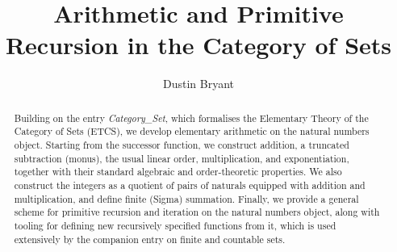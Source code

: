 \documentclass[11pt,a4paper]{article}
\begin{document}
\title{Arithmetic and Primitive Recursion in the Category of Sets}
\author{Dustin Bryant}
\maketitle

\begin{abstract}
  Building on the entry \emph{Category\_Set}, which formalises the
  Elementary Theory of the Category of Sets (ETCS), we develop
  elementary arithmetic on the natural numbers object. Starting from
  the successor function, we construct addition, a truncated
  subtraction (monus), the usual linear order, multiplication, and
  exponentiation, together with their standard algebraic and
  order-theoretic properties. We also construct the integers as a
  quotient of pairs of naturals equipped with addition and
  multiplication, and define finite (Sigma) summation. Finally, we
  provide a general scheme for primitive recursion and iteration on
  the natural numbers object, along with tooling for defining new
  recursively specified functions from it, which is used extensively
  by the companion entry on finite and countable sets.
\end{abstract}

\tableofcontents





\end{document}
